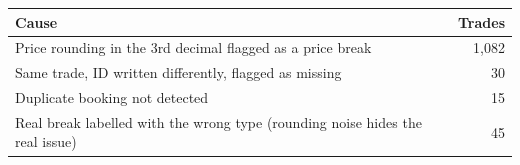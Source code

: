 \begin{tabular}{@{}lr@{}}
\toprule
\textbf{Cause} & \textbf{Trades} \\
\midrule
Price rounding in the 3rd decimal flagged as a price break & 1,082 \\
Same trade, ID written differently, flagged as missing & 30 \\
Duplicate booking not detected & 15 \\
Real break labelled with the wrong type (rounding noise hides the real issue) & 45 \\
\bottomrule
\end{tabular}